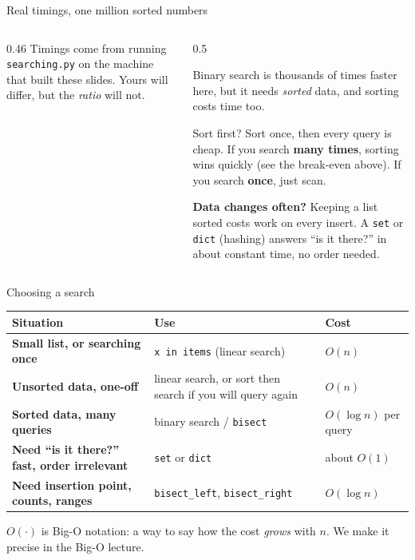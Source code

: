 \documentclass[aspectratio=169,10pt]{beamer}
\begin{document}
\begin{frame}{Real timings, one million sorted numbers}
\begin{columns}[T]
\begin{column}{0.46\textwidth}
\vspace{2mm}
{\footnotesize Timings come from running \texttt{searching.py} on the machine that built these slides. Yours will differ, but the \emph{ratio} will not.}
\end{column}
\begin{column}{0.5\textwidth}
{\small
Binary search is thousands of times faster here, but it needs \emph{sorted} data, and sorting costs time too.

\vspace{2mm}
\begin{block}{Sort first?}
{\small Sort once, then every query is cheap. If you search \textbf{many times}, sorting wins quickly (see the break-even above). If you search \textbf{once}, just scan.}
\end{block}
\vspace{1mm}
\textbf{Data changes often?} Keeping a list sorted costs work on every insert. A \texttt{set} or \texttt{dict} (hashing) answers ``is it there?'' in about constant time, no order needed.}
\end{column}
\end{columns}
\end{frame}

\begin{frame}{Choosing a search}
\renewcommand{\arraystretch}{1.25}
\small
\begin{tabularx}{\textwidth}{@{}>{\raggedright\bfseries}p{42mm}XX@{}}
\toprule
Situation & Use & Cost\\
\midrule
Small list, or searching once & \texttt{x in items} (linear search) & $O(n)$\\
Unsorted data, one-off & linear search, or sort then search if you will query again & $O(n)$\\
Sorted data, many queries & binary search / \texttt{bisect} & $O(\log n)$ per query\\
Need ``is it there?'' fast, order irrelevant & \texttt{set} or \texttt{dict} & about $O(1)$\\
Need insertion point, counts, ranges & \texttt{bisect\_left}, \texttt{bisect\_right} & $O(\log n)$\\
\bottomrule
\end{tabularx}
\vspace{3mm}

{\small $O(\cdot)$ is Big-O notation: a way to say how the cost \emph{grows} with $n$. We make it precise in the Big-O lecture.}
\end{frame}
\end{document}
